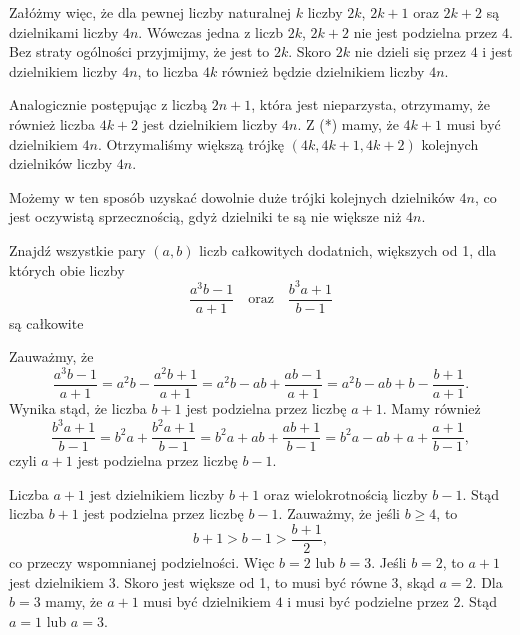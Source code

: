 \vspace{10px}

\noindent
Załóżmy więc, że dla pewnej liczby naturalnej $k$ liczby $2k$, $2k + 1$ oraz $2k + 2$ są dzielnikami liczby $4n$. Wówczas jedna z liczb $2k$, $2k + 2$ nie jest podzielna przez $4$. Bez straty ogólności przyjmijmy, że jest to $2k$. Skoro $2k$ nie dzieli się przez $4$ i jest dzielnikiem liczby $4n$, to liczba $4k$ również będzie dzielnikiem liczby $4n$. 

Analogicznie postępując z liczbą $2n + 1$, która jest nieparzysta, otrzymamy, że również liczba $4k + 2$ jest dzielnikiem liczby $4n$. Z (*) mamy, że $4k + 1$ musi być dzielnikiem $4n$. Otrzymaliśmy większą trójkę $(4k, 4k + 1, 4k + 2)$ kolejnych dzielników liczby $4n$.

\vspace{10px}

\noindent
Możemy w ten sposób uzyskać dowolnie duże trójki kolejnych dzielników $4n$, co jest oczywistą sprzecznością, gdyż dzielniki te są nie większe niż $4n$.

\vspace{10px}

\begin{problem}{4}
	Znajdź wszystkie pary $(a, b)$ liczb całkowitych dodatnich, większych od 1, dla których obie liczby
	\[
		\frac{a^3b - 1}{a + 1} \quad \text{oraz} \quad \frac{b^3a + 1}{b - 1}
	\]
	są całkowite
\end{problem}


\noindent
Zauważmy, że 
\[
	\frac{a^3b - 1}{a + 1} = a^2b - \frac{a^2b + 1}{a + 1} = a^2b - ab + \frac{ab - 1}{a + 1} = a^2b - ab + b - \frac{b + 1}{a + 1}.
\]
Wynika stąd, że liczba $b + 1$ jest podzielna przez liczbę $a + 1$. Mamy również
\[
	\frac{b^3a + 1}{b - 1} = b^2a + \frac{b^2a + 1}{b - 1} = b^2a + ab + \frac{ab + 1}{b - 1} = b^2a - ab + a + \frac{a + 1}{b - 1},
\]
czyli $a + 1$ jest podzielna przez liczbę $b - 1$. 

\vspace{10px}

\noindent
Liczba $a + 1$ jest dzielnikiem liczby $b + 1$ oraz wielokrotnością liczby $b - 1$. Stąd liczba $b + 1$ jest podzielna przez liczbę $b - 1$. Zauważmy, że jeśli $b \geqslant 4$, to
\[
	b + 1 > b - 1 > \frac{b + 1}{2},
\]
co przeczy wspomnianej podzielności.
Więc $b = 2$ lub $b = 3$. Jeśli $b = 2$, to $a + 1$ jest dzielnikiem $3$. Skoro jest większe od 1, to musi być równe 3, skąd $a = 2$. Dla $b = 3$ mamy, że $a + 1$ musi być dzielnikiem $4$ i musi być podzielne przez $2$. Stąd $a = 1$ lub $a = 3$. 


